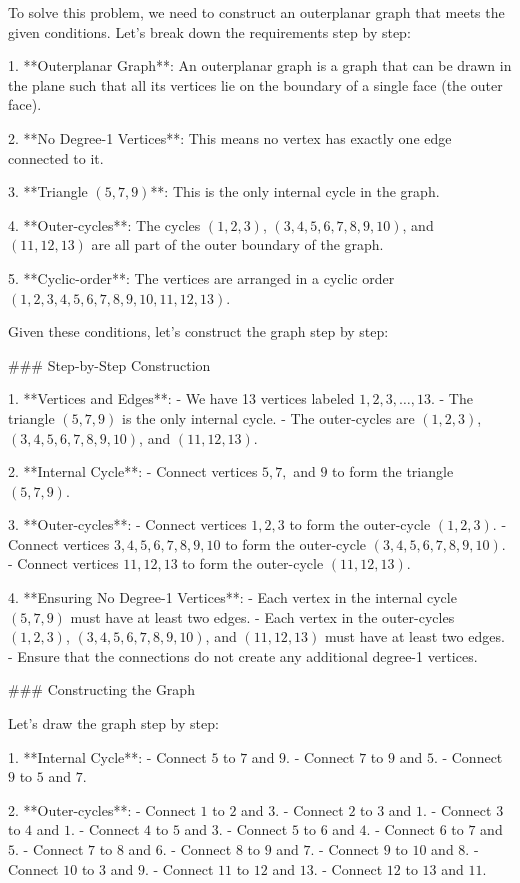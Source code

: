 To solve this problem, we need to construct an outerplanar graph that meets the given conditions. Let's break down the requirements step by step:

1. **Outerplanar Graph**: An outerplanar graph is a graph that can be drawn in the plane such that all its vertices lie on the boundary of a single face (the outer face).

2. **No Degree-1 Vertices**: This means no vertex has exactly one edge connected to it.

3. **Triangle \((5,7,9)\)**: This is the only internal cycle in the graph.

4. **Outer-cycles**: The cycles \((1,2,3)\), \((3,4,5,6,7,8,9,10)\), and \((11,12,13)\) are all part of the outer boundary of the graph.

5. **Cyclic-order**: The vertices are arranged in a cyclic order \((1,2,3,4,5,6,7,8,9,10,11,12,13)\).

Given these conditions, let's construct the graph step by step:

### Step-by-Step Construction

1. **Vertices and Edges**:
   - We have 13 vertices labeled \(1, 2, 3, \ldots, 13\).
   - The triangle \((5,7,9)\) is the only internal cycle.
   - The outer-cycles are \((1,2,3)\), \((3,4,5,6,7,8,9,10)\), and \((11,12,13)\).

2. **Internal Cycle**:
   - Connect vertices \(5, 7,\) and \(9\) to form the triangle \((5,7,9)\).

3. **Outer-cycles**:
   - Connect vertices \(1, 2, 3\) to form the outer-cycle \((1,2,3)\).
   - Connect vertices \(3, 4, 5, 6, 7, 8, 9, 10\) to form the outer-cycle \((3,4,5,6,7,8,9,10)\).
   - Connect vertices \(11, 12, 13\) to form the outer-cycle \((11,12,13)\).

4. **Ensuring No Degree-1 Vertices**:
   - Each vertex in the internal cycle \((5,7,9)\) must have at least two edges.
   - Each vertex in the outer-cycles \((1,2,3)\), \((3,4,5,6,7,8,9,10)\), and \((11,12,13)\) must have at least two edges.
   - Ensure that the connections do not create any additional degree-1 vertices.

### Constructing the Graph

Let's draw the graph step by step:

1. **Internal Cycle**:
   - Connect \(5\) to \(7\) and \(9\).
   - Connect \(7\) to \(9\) and \(5\).
   - Connect \(9\) to \(5\) and \(7\).

2. **Outer-cycles**:
   - Connect \(1\) to \(2\) and \(3\).
   - Connect \(2\) to \(3\) and \(1\).
   - Connect \(3\) to \(4\) and \(1\).
   - Connect \(4\) to \(5\) and \(3\).
   - Connect \(5\) to \(6\) and \(4\).
   - Connect \(6\) to \(7\) and \(5\).
   - Connect \(7\) to \(8\) and \(6\).
   - Connect \(8\) to \(9\) and \(7\).
   - Connect \(9\) to \(10\) and \(8\).
   - Connect \(10\) to \(3\) and \(9\).
   - Connect \(11\) to \(12\) and \(13\).
   - Connect \(12\) to \(13\) and \(11\).

